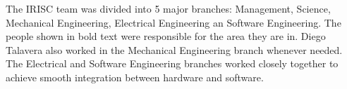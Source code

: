 The IRISC team was divided into 5 major branches: Management, Science, Mechanical Engineering, Electrical Engineering an Software Engineering. The people shown in bold text were responsible for the area they are in. Diego Talavera also worked in the Mechanical Engineering branch whenever needed. The Electrical and Software Engineering branches worked closely together to achieve smooth integration between hardware and software.

